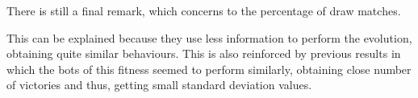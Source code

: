 \documentclass[preprint]{elsarticle}
\begin{document}
There is still a final remark, which concerns to the percentage of draw matches.


This can be explained because they use less
information to perform the evolution, obtaining quite similar
behaviours. %
This is also reinforced by previous results in which the
bots of this fitness seemed to perform similarly, obtaining close
number of victories and thus, getting small standard deviation
values. 





\end{document}
